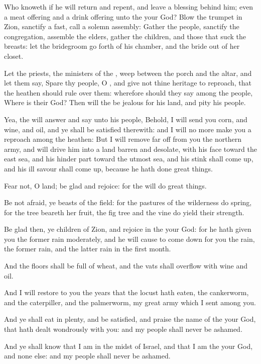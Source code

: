 \Verse Who knoweth if he will return and repent, and leave a blessing behind him; even a meat offering and a drink offering unto the \LORD your God?  \Verse Blow the trumpet in Zion, sanctify a fast, call a solemn assembly: \Verse Gather the people, sanctify the congregation, assemble the elders, gather the children, and those that suck the breasts: let the bridegroom go forth of his chamber, and the bride out of her closet.

\Verse Let the priests, the ministers of the \LORD, weep between the porch and the altar, and let them say, Spare thy people, O \LORD, and give not thine heritage to reproach, that the heathen should rule over them: wherefore should they say among the people, Where is their God?  \Verse Then will the \LORD be jealous for his land, and pity his people.

\Verse Yea, the \LORD will answer and say unto his people, Behold, I will send you corn, and wine, and oil, and ye shall be satisfied therewith: and I will no more make you a reproach among the heathen: \Verse But I will remove far off from you the northern army, and will drive him into a land barren and desolate, with his face toward the east sea, and his hinder part toward the utmost sea, and his stink shall come up, and his ill savour shall come up, because he hath done great things.

\Verse Fear not, O land; be glad and rejoice: for the \LORD will do great things.

\Verse Be not afraid, ye beasts of the field: for the pastures of the wilderness do spring, for the tree beareth her fruit, the fig tree and the vine do yield their strength.

\Verse Be glad then, ye children of Zion, and rejoice in the \LORD your God: for he hath given you the former rain moderately, and he will cause to come down for you the rain, the former rain, and the latter rain in the first month.

\Verse And the floors shall be full of wheat, and the vats shall overflow with wine and oil.

\Verse And I will restore to you the years that the locust hath eaten, the cankerworm, and the caterpiller, and the palmerworm, my great army which I sent among you.

\Verse And ye shall eat in plenty, and be satisfied, and praise the name of the \LORD your God, that hath dealt wondrously with you: and my people shall never be ashamed.

\Verse And ye shall know that I am in the midst of Israel, and that I am the \LORD your God, and none else: and my people shall never be ashamed.


